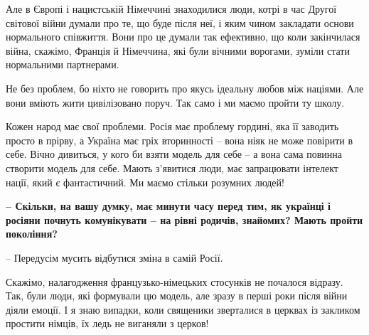 Але в Європі і нацистській Німеччині знаходилися люди, котрі в час Другої
світової війни думали про те, що буде після неї, і яким чином закладати основи
нормального співжиття. Вони про це думали так ефективно, що коли закінчилася
війна, скажімо, Франція й Німеччина, які були вічними ворогами, зуміли стати
нормальними партнерами. 

Не без проблем, бо ніхто не говорить про якусь ідеальну любов між націями. Але
вони вміють жити цивілізовано поруч. Так само і ми маємо пройти ту школу. 

Кожен народ має свої проблеми. Росія має проблему гордині, яка її заводить
просто в прірву, а Україна має гріх вторинності – вона ніяк не може повірити в
себе. Вічно дивиться, у кого би взяти модель для себе – а вона сама повинна
створити модель для себе. Мають з’явитися люди, має  запрацювати інтелект
нації, який є фантастичний. Ми маємо стільки розумних людей!

\textbf{– Скільки, на вашу думку, має минути часу перед тим, як українці і росіяни
почнуть комунікувати – на рівні родичів, знайомих? Мають пройти покоління?}

– Передусім мусить відбутися зміна в самій Росії. 

Скажімо, налагодження французько-німецьких стосунків не почалося відразу. Так,
були люди, які формували цю модель, але зразу в перші роки після війни діяли
емоції. І я знаю випадки, коли священики зверталися в церквах із закликом
простити німців, їх ледь не виганяли з церков!

